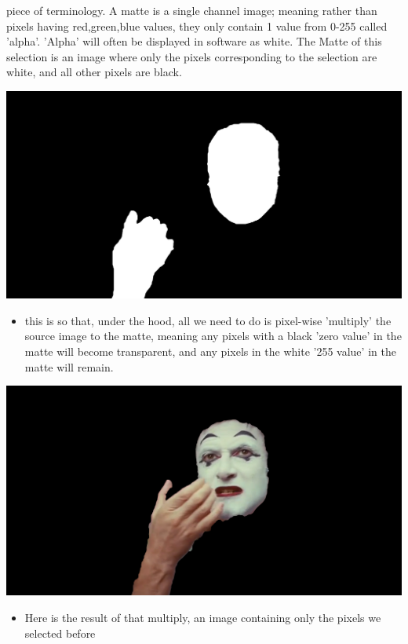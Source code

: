 \documentclass[11pt]{article}
\begin{document}
\begin{itemize}
piece of terminology. A matte is a single channel image; meaning rather than
pixels having red,green,blue values, they only contain 1 value from 0-255
called 'alpha'. 'Alpha' will often be displayed in software as white. The
Matte of this selection is an image where only the pixels corresponding to the
selection are white, and all other pixels are black.
\begin{center}
\includegraphics[width=.9\linewidth]{./roto/matte.PNG}
\end{center}
\begin{itemize}
\item this is so that, under the hood, all we need to do is pixel-wise 'multiply' the
source image to the matte, meaning any pixels with a black 'zero value' in
the matte will become transparent, and any pixels in the white '255 value'
in the matte will remain.
\end{itemize}
\begin{center}
\includegraphics[width=.9\linewidth]{./roto/goals.PNG}
\end{center}
\begin{itemize}
\item Here is the result of that multiply, an image containing only the pixels we
selected before
\end{itemize}
\end{itemize}
\end{document}
